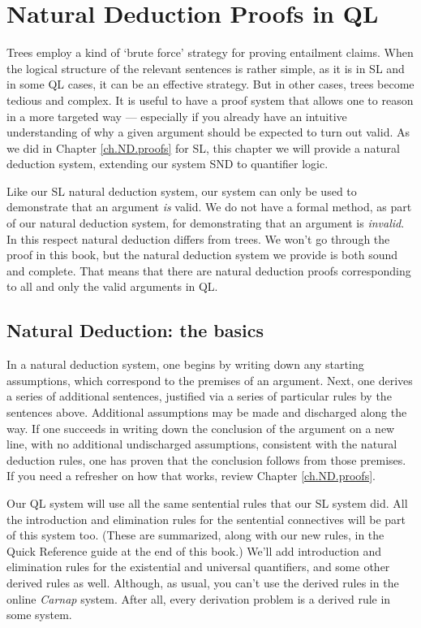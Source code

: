 ﻿%
\chapter{Natural Deduction Proofs in QL}
\label{ch.QLND}


Trees employ a kind of `brute force' strategy for proving entailment claims. When the logical structure of the relevant sentences is rather simple, as it is in SL and in some QL cases, it can be an effective strategy. But in other cases, trees become tedious and complex. It is useful to have a proof system that allows one to reason in a more targeted way --- especially if you already have an intuitive understanding of why a given argument should be expected to turn out valid. As we did in Chapter \ref{ch.ND.proofs} for SL, this chapter we will provide a natural deduction system, extending our system SND to quantifier logic. 

Like our SL natural deduction system, our system can only be used to demonstrate that an argument \emph{is} valid. We do not have a formal method, as part of our natural deduction system, for demonstrating that an argument is \emph{invalid}. In this respect natural deduction differs from trees. We won't go through the proof in this book, but the natural deduction system we provide is both sound and complete. That means that there are natural deduction proofs corresponding to all and only the valid arguments in QL.

\section{Natural Deduction: the basics}

In a natural deduction system, one begins by writing down any starting assumptions, which correspond to the premises of an argument. Next, one derives a series of additional sentences, justified via a series of particular rules by the sentences above. Additional assumptions may be made and discharged along the way. If one succeeds in writing down the conclusion of the argument on a new line, with no additional undischarged assumptions, consistent with the natural deduction rules, one has proven that the conclusion follows from those premises. If you need a refresher on how that works, review Chapter \ref{ch.ND.proofs}.

Our QL system will use all the same sentential rules that our SL system did. All the introduction and elimination rules for the sentential connectives will be part of this system too. (These are summarized, along with our new rules, in the Quick Reference guide at the end of this book.) We'll add introduction and elimination rules for the existential and universal quantifiers, and some other derived rules as well. {\color{black} Although, as usual, you can't use the derived rules in the online \textit{Carnap} system. After all, every derivation problem is a derived rule in some system.}

